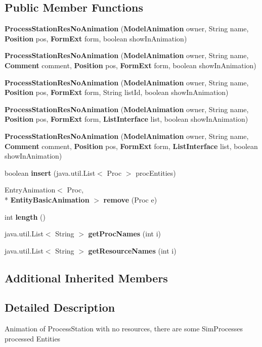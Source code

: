 \subsection*{Public Member Functions}
\begin{DoxyCompactItemize}
\item 
{\bf Process\-Station\-Res\-No\-Animation} ({\bf Model\-Animation} owner, String name, {\bf Position} pos, {\bf Form\-Ext} form, boolean show\-In\-Animation)
\item 
{\bf Process\-Station\-Res\-No\-Animation} ({\bf Model\-Animation} owner, String name, {\bf Comment} comment, {\bf Position} pos, {\bf Form\-Ext} form, boolean show\-In\-Animation)
\item 
{\bf Process\-Station\-Res\-No\-Animation} ({\bf Model\-Animation} owner, String name, {\bf Position} pos, {\bf Form\-Ext} form, String list\-Id, boolean show\-In\-Animation)
\item 
{\bfseries Process\-Station\-Res\-No\-Animation} ({\bf Model\-Animation} owner, String name, {\bf Position} pos, {\bf Form\-Ext} form, {\bf List\-Interface} list, boolean show\-In\-Animation)\label{classdesmoj_1_1extensions_1_1visualization2d_1_1animation_1_1process_station_1_1_process_station1b394a660a929ad0a3f8ca514517e8bd_aa1d5f6d949d1c0892dcc5b23feed0ebf}

\item 
{\bf Process\-Station\-Res\-No\-Animation} ({\bf Model\-Animation} owner, String name, {\bf Comment} comment, {\bf Position} pos, {\bf Form\-Ext} form, {\bf List\-Interface} list, boolean show\-In\-Animation)
\item 
boolean {\bf insert} (java.\-util.\-List$<$ Proc $>$ proc\-Entities)
\item 
Entry\-Animation$<$ Proc, \\*
{\bf Entity\-Basic\-Animation} $>$ {\bf remove} (Proc e)
\item 
int {\bf length} ()
\item 
java.\-util.\-List$<$ String $>$ {\bf get\-Proc\-Names} (int i)
\item 
java.\-util.\-List$<$ String $>$ {\bf get\-Resource\-Names} (int i)
\end{DoxyCompactItemize}
\subsection*{Additional Inherited Members}


\subsection{Detailed Description}
Animation of Process\-Station with no resources, there are some Sim\-Processes processed Entities

